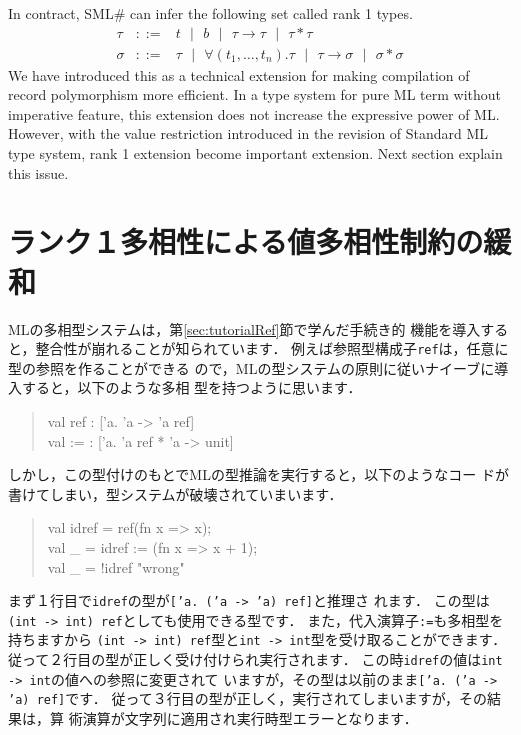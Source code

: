 \documentclass{jbook}
\newif\ifjp
\newcommand{\txt}[2]{#1}
\newcommand{\smlsharp}{SML\#}
\newcommand{\func}{\rightarrow}
\newcommand{\vbar}{\mbox{\ $|$\ }}
\newenvironment{program}{\begin{quote}\begin{tt}}%
                        {\end{tt}\end{quote}}
\begin{document}
	In contract, \smlsharp{} can infer the following set called rank
1 types.
\begin{eqnarray*}
\tau &::=& t \vbar b \vbar \tau \func \tau \vbar \tau * \tau
\\
\sigma &::=& \tau \vbar \forall (t_1,\ldots,t_n).\tau 
\vbar \tau \func \sigma
\vbar \sigma * \sigma 
\end{eqnarray*}
	We have introduced this as a technical extension for making 
compilation of record polymorphism  more efficient.
	In a type system for pure ML term without imperative feature,
this extension does not increase the expressive power of ML.
	However, with the value restriction introduced in the revision
of Standard ML type system, rank 1 extension become important extension.
	Next section explain this issue.
\fi%

\section{\txt{ランク１多相性による値多相性制約の緩和}
{Value polymorphism restriction and rank 1 typing}
}
\label{sec:extensionValuerestriction}

\ifjp%
	MLの多相型システムは，第\ref{sec:tutorialRef}節で学んだ手続き的
機能を導入すると，整合性が崩れることが知られています．
	例えば参照型構成子{\tt ref}は，任意に型の参照を作ることができる
ので，MLの型システムの原則に従いナイーブに導入すると，以下のような多相
型を持つように思います．
\begin{program}
val ref : ['a. 'a -> 'a ref]\\
val := :  ['a. 'a ref * 'a -> unit]
\end{program}
	しかし，この型付けのもとでMLの型推論を実行すると，以下のようなコー
ドが書けてしまい，型システムが破壊されていまいます．
\begin{program}
val idref = ref(fn x => x);\\
val \_ = idref := (fn x => x + 1);\\
val \_ = !idref "wrong"
\end{program}
	まず１行目で{\tt idref}の型が{\tt ['a. ('a -> 'a) ref]}と推理さ
れます．
	この型は{\tt (int -> int) ref}としても使用できる型です．
	また，代入演算子{\tt :=}も多相型を持ちますから
{\tt (int -> int) ref}型と{\tt int -> int}型を受け取ることができます．
	従って２行目の型が正しく受け付けられ実行されます．
	この時{\tt idref}の値は{\tt int -> int}の値への参照に変更されて
いますが，その型は以前のまま{\tt ['a. ('a -> 'a) ref]}です．
	従って３行目の型が正しく，実行されてしまいますが，その結果は，算
術演算が文字列に適用され実行時型エラーとなります．
\end{document}
